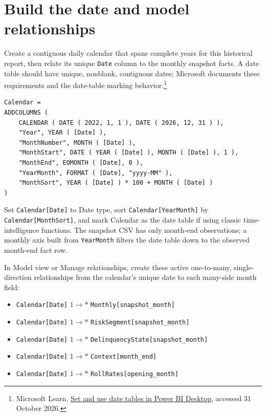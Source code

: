 \documentclass[11pt]{article}
\begin{document}
\section{Build the date and model relationships}

Create a contiguous daily calendar that spans complete years for this historical report, then relate its unique \texttt{Date} column to the monthly snapshot facts. A date table should have unique, nonblank, contiguous dates; Microsoft documents these requirements and the date-table marking behavior.\footnote{Microsoft Learn, \href{https://learn.microsoft.com/en-us/power-bi/transform-model/desktop-date-tables}{Set and use date tables in Power BI Desktop}, accessed 31 October 2026.}

\begin{lstlisting}
Calendar =
ADDCOLUMNS (
    CALENDAR ( DATE ( 2022, 1, 1 ), DATE ( 2026, 12, 31 ) ),
    "Year", YEAR ( [Date] ),
    "MonthNumber", MONTH ( [Date] ),
    "MonthStart", DATE ( YEAR ( [Date] ), MONTH ( [Date] ), 1 ),
    "MonthEnd", EOMONTH ( [Date], 0 ),
    "YearMonth", FORMAT ( [Date], "yyyy-MM" ),
    "MonthSort", YEAR ( [Date] ) * 100 + MONTH ( [Date] )
)
\end{lstlisting}

Set \texttt{Calendar[Date]} to Date type, sort \texttt{Calendar[YearMonth]} by \texttt{Calendar[MonthSort]}, and mark Calendar as the date table if using classic time-intelligence functions. The snapshot CSV has only month-end observations; a monthly axis built from \texttt{YearMonth} filters the date table down to the observed month-end fact row.

In Model view or Manage relationships, create these active one-to-many, single-direction relationships from the calendar's unique date to each many-side month field:

\begin{itemize}
\item \texttt{Calendar[Date]} $1\rightarrow *$ \texttt{Monthly[snapshot\_month]}
\item \texttt{Calendar[Date]} $1\rightarrow *$ \texttt{RiskSegment[snapshot\_month]}
\item \texttt{Calendar[Date]} $1\rightarrow *$ \texttt{DelinquencyState[snapshot\_month]}
\item \texttt{Calendar[Date]} $1\rightarrow *$ \texttt{Context[month\_end]}
\item \texttt{Calendar[Date]} $1\rightarrow *$ \texttt{RollRates[opening\_month]}
\end{itemize}
\end{document}
